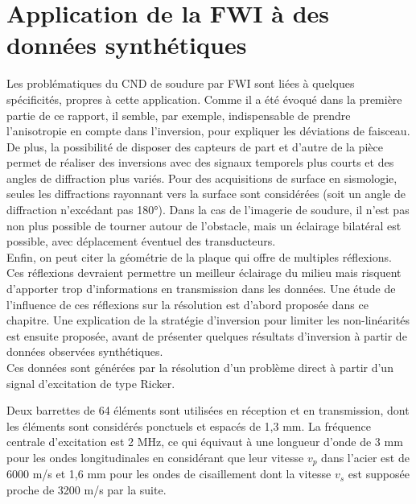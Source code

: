 \chapter{Application de la FWI à des données synthétiques \label{applications}}


Les problématiques du CND de soudure par FWI sont liées à quelques spécificités, propres à cette application. Comme il a été évoqué dans la première partie de ce rapport, il semble, par exemple, indispensable de prendre l'anisotropie en compte dans l'inversion, pour expliquer les déviations de faisceau.\\

De plus, la possibilité de disposer des capteurs de part et d'autre de la pièce permet de réaliser des inversions avec des signaux temporels plus courts et des angles de diffraction plus variés. Pour des acquisitions de surface en sismologie, seules les diffractions rayonnant vers la surface sont considérées (soit un angle de diffraction n'excédant pas 180°). Dans la cas de l'imagerie de soudure, il n'est pas non plus possible de tourner autour de l'obstacle, mais un éclairage bilatéral est possible, avec déplacement éventuel des transducteurs.\\

Enfin, on peut citer la géométrie de la plaque qui offre de multiples réflexions. Ces réflexions devraient permettre un meilleur éclairage du milieu mais risquent d'apporter trop d'informations en transmission dans les données. Une étude de l'influence de ces réflexions sur la résolution est d'abord proposée dans ce chapitre. Une explication de la stratégie d'inversion pour limiter les non-linéarités est ensuite proposée, avant de présenter quelques résultats d'inversion à partir de données observées synthétiques.\\

Ces données sont générées par la résolution d'un problème direct à partir d'un signal d'excitation de type Ricker.

Deux barrettes de 64 éléments sont utilisées en réception et en transmission, dont les éléments sont considérés ponctuels et espacés de 1,3 mm. La fréquence centrale d'excitation est 2 MHz, ce qui équivaut à une longueur d'onde de 3 mm pour les ondes longitudinales en considérant que leur vitesse $v_{p}$ dans l'acier est de 6000 m/s et 1,6 mm pour les ondes de cisaillement dont la vitesse $v_{s}$ est supposée proche de 3200 m/s par la suite.

